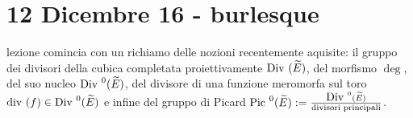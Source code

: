 
\chapter{12 Dicembre 16 - burlesque}
\justify

 lezione comincia con un richiamo delle nozioni recentemente aquisite: il gruppo dei divisori della cubica completata proiettivamente $\mbox{Div }(\widetilde{E})$, del morfismo $\deg$, del suo nucleo $\mbox{Div }^0(\widetilde{E})$, del divisore di una funzione meromorfa sul toro $\mbox{div }(f)\in\mbox{Div }^0(\widetilde{E})$ e infine del gruppo di Picard $\mbox{Pic }^0(\widetilde{E}) := \frac{\mbox{Div }^0(\widetilde{E})}{\text{divisori principali}}$.
